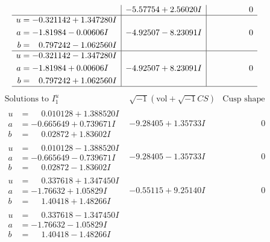 \documentclass[1p]{elsarticle_modified}
\theoremstyle{definition}
\newcommand{\I}{\sqrt{-1}}
\begin{document}
$$\begin{array}{c|c|c}
 & -5.57754 + 2.56020 I & \phantom{-0.000000 } 0 \\ \hline\begin{aligned}
u &= -0.321142 + 1.347280 I \\
a &= -1.81984 - 0.00606 I \\
b &= \phantom{-}0.797242 - 1.062560 I\end{aligned}
 & -4.92507 - 8.23091 I & \phantom{-0.000000 } 0 \\ \hline\begin{aligned}
u &= -0.321142 - 1.347280 I \\
a &= -1.81984 + 0.00606 I \\
b &= \phantom{-}0.797242 + 1.062560 I\end{aligned}
 & -4.92507 + 8.23091 I & \phantom{-0.000000 } 0\\
 \hline 
 \end{array}$$\newpage$$\begin{array}{c|c|c}  
\text{Solutions to }I^u_{1}& \I (\text{vol} + \sqrt{-1}CS) & \text{Cusp shape}\\
 \hline 
\begin{aligned}
u &= \phantom{-}0.010128 + 1.388520 I \\
a &= -0.665649 + 0.739671 I \\
b &= \phantom{-}0.02872 + 1.83602 I\end{aligned}
 & -9.28405 + 1.35733 I & \phantom{-0.000000 } 0 \\ \hline\begin{aligned}
u &= \phantom{-}0.010128 - 1.388520 I \\
a &= -0.665649 - 0.739671 I \\
b &= \phantom{-}0.02872 - 1.83602 I\end{aligned}
 & -9.28405 - 1.35733 I & \phantom{-0.000000 } 0 \\ \hline\begin{aligned}
u &= \phantom{-}0.337618 + 1.347450 I \\
a &= -1.76632 + 1.05829 I \\
b &= \phantom{-}1.40418 + 1.48266 I\end{aligned}
 & -0.55115 + 9.25140 I & \phantom{-0.000000 } 0 \\ \hline\begin{aligned}
u &= \phantom{-}0.337618 - 1.347450 I \\
a &= -1.76632 - 1.05829 I \\
b &= \phantom{-}1.40418 - 1.48266 I\end{aligned}

\end{array}$$
\end{document}
